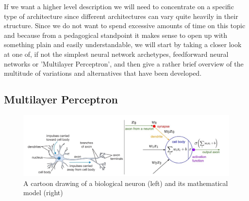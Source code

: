 \documentclass[preprint,12pt,3p]{elsarticle}
\begin{document}
If we want a higher level description we will need to concentrate on a specific type of architecture since different architectures can vary quite heavily in their structure. Since we do not want to spend excessive amounts of time on this topic and because from a pedagogical standpoint it makes sense to open up with something plain and easily understandable, we will start by taking a closer look at one of, if not the simplest neural network archetypes, feedforward neural networks or 'Multilayer Perceptron', and then give a rather brief overview of the multitude of variations and alternatives that have been developed.



\subsection{Multilayer Perceptron}

\begin{figure}
    \centering
    \hspace*{-1.5cm}\includegraphics[scale=0.5]{figures/ANNs}
    \caption{A cartoon drawing of a biological neuron (left) and its mathematical model (right) \cite{Xmisc}}
    \label{fig:ANNs}
\end{figure}
\end{document}

